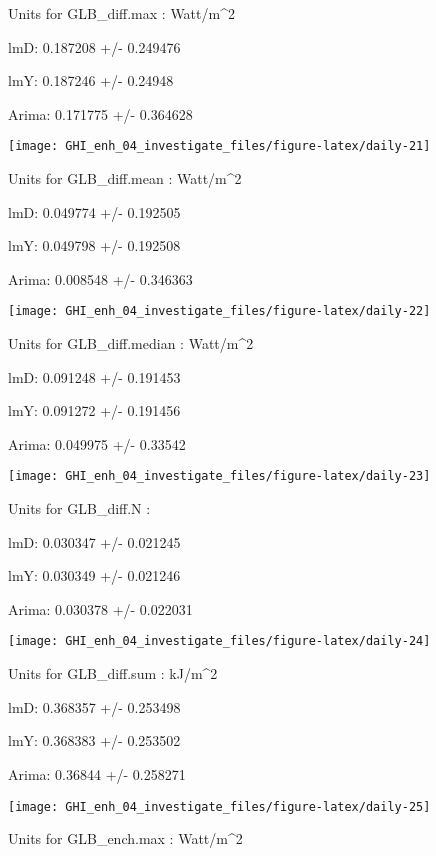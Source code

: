 \documentclass[
  10pt,
  a4paper,oneside]{article}
\begin{document}
Units for GLB\_diff.max : Watt/m\^{}2

lmD: 0.187208 +/- 0.249476

lmY: 0.187246 +/- 0.24948

Arima: 0.171775 +/- 0.364628

\begin{center}\texttt{[image: GHI\_enh\_04\_investigate\_files/figure-latex/daily-21]} \end{center}

Units for GLB\_diff.mean : Watt/m\^{}2

lmD: 0.049774 +/- 0.192505

lmY: 0.049798 +/- 0.192508

Arima: 0.008548 +/- 0.346363

\begin{center}\texttt{[image: GHI\_enh\_04\_investigate\_files/figure-latex/daily-22]} \end{center}

Units for GLB\_diff.median : Watt/m\^{}2

lmD: 0.091248 +/- 0.191453

lmY: 0.091272 +/- 0.191456

Arima: 0.049975 +/- 0.33542

\begin{center}\texttt{[image: GHI\_enh\_04\_investigate\_files/figure-latex/daily-23]} \end{center}

Units for GLB\_diff.N :

lmD: 0.030347 +/- 0.021245

lmY: 0.030349 +/- 0.021246

Arima: 0.030378 +/- 0.022031

\begin{center}\texttt{[image: GHI\_enh\_04\_investigate\_files/figure-latex/daily-24]} \end{center}

Units for GLB\_diff.sum : kJ/m\^{}2

lmD: 0.368357 +/- 0.253498

lmY: 0.368383 +/- 0.253502

Arima: 0.36844 +/- 0.258271

\begin{center}\texttt{[image: GHI\_enh\_04\_investigate\_files/figure-latex/daily-25]} \end{center}

Units for GLB\_ench.max : Watt/m\^{}2
\end{document}
